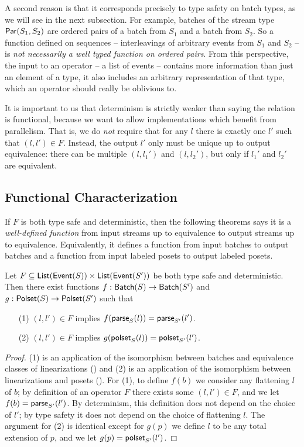 A second reason is that it corresponds precisely to type safety on batch types, as we will see in the next subsection. For example, batches of the stream type $\parcomp{S_1}{S_2}$ are ordered pairs of a batch from $S_1$ and a batch from $S_2$. So a function defined on sequences -- interleavings of arbitrary events from $S_1$ and $S_2$ -- is \emph{not necessarily a well typed function on ordered pairs}.
From this perspective, the input to an operator -- a list of events -- contains more information than just an element of a type, it also includes an arbitrary representation of that type, which an operator should really be oblivious to.

It is important to us that determinism is strictly weaker than saying the relation is functional, because we want to allow implementations which benefit from parallelism. That is, we do \emph{not} require that for any $l$ there is exactly one $l'$ such that $(l, l') \in F$. Instead, the output $l'$ only must be unique up to output equivalence: there can be multiple $(l, l_1')$ and $(l, l_2')$, but only if $l_1'$ and $l_2'$ are equivalent.

\subsection{Functional Characterization}

If $F$ is both type safe and deterministic, then the following theorems says it is a \emph{well-defined function} from input streams up to equivalence to output streams up to equivalence.
Equivalently, it defines a function from input batches to output batches
and a function from input labeled posets to output labeled posets.

\begin{theorem}
\label{thm:type-safe-and-deterministic-consequence}
Let $F \subseteq \listtype{\event{S}} \times \listtype{\event{S'}}$ be both type safe and deterministic.
Then there exist functions $f: \batch{S} \to \batch{S'}$ and $g: \poset{S} \to \poset{S'}$
such that
\begin{enumerate}
\item[(1)] $(l, l') \in F$ implies $f(\parselin{l}{S}) = \parselin{l'}{S'}$.
\item[(2)] $(l, l') \in F$ implies $g(\posetlin{l}{S}) = \posetlin{l'}{S'}$.
\end{enumerate}
\end{theorem}
\begin{proof}
(1) is an application of the isomorphism between batches and equivalence classes of linearizations () and (2) is an application of the isomorphism between linearizations and posets ().
For (1), to define $f(b)$ we consider any flattening $l$ of $b$; by definition of an operator $F$ there exists some $(l, l') \in F$, and we let $f(b) = \parselin{l'}{S'}$. By determinism, this definition does not depend on the choice of $l'$; by type safety it does not depend on the choice of flattening $l$.
The argument for (2) is identical except for $g(p)$ we define $l$ to be any total extension of $p$, and we let $g(p) = \posetlin{l'}{S'}$.
\end{proof}

